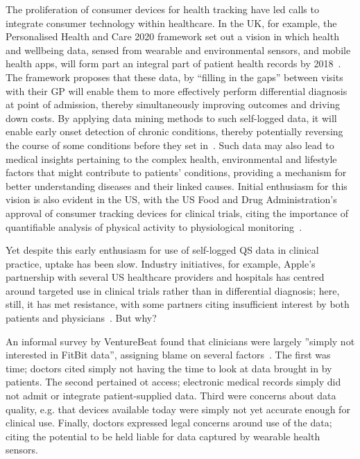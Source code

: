 \documentclass{sigchi}
\begin{document}
The proliferation of consumer devices for health tracking have led calls to integrate consumer technology within healthcare. In the UK, for example, the Personalised Health and Care 2020 framework set out a vision in which health and wellbeing data, sensed from wearable and environmental sensors, and mobile health apps, will form part an integral part of patient health records by 2018~\cite{Personalised2014}.  The framework proposes that these data, by ``filling in the gaps'' between visits with their GP will enable them to more effectively perform differential diagnosis at point of admission, thereby simultaneously improving outcomes and driving down costs.  By applying data mining methods to such self-logged data, it will enable early onset detection of chronic conditions, thereby potentially reversing the course of some conditions before they set in~\cite{Swan2009}.  Such data may also lead to medical insights pertaining to the complex health, environmental and lifestyle factors that might contribute to patients' conditions, providing a mechanism for better understanding diseases and their linked causes.  Initial enthusiasm for this vision is also evident in the US, with the US Food and Drug Administration's approval of  consumer tracking devices for clinical trials, citing the importance of quantifiable analysis of physical activity to physiological monitoring~\cite{U.S.FoodandDrugAdministration2014}.

Yet despite this early enthusiasm for use of self-logged QS data in clinical practice, uptake has been slow.  Industry initiatives, for example, Apple's  partnership with several US healthcare providers and hospitals has centred around targeted use in clinical trials rather than in differential diagnosis; here, still, it has met resistance, with some partners citing insufficient interest by both patients and physicians~\cite{}.  But why?

An informal survey by VentureBeat found that clinicians were largely ''simply not interested in FitBit data'', assigning blame on several factors~\cite{venturebeat}. The first was time; doctors cited simply not having the time to look at data brought in by patients.  The second pertained ot access; electronic medical records simply did not admit or integrate patient-supplied data.  Third were concerns about data quality, e.g. that devices available today were simply not yet accurate enough for clinical use.  Finally, doctors expressed legal concerns around use of the data; citing the potential to be held liable for data captured by wearable health sensors.
\end{document}

